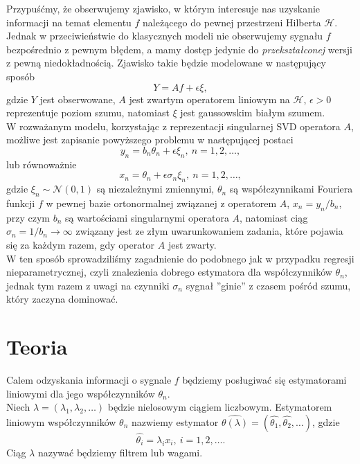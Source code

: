 \documentclass[a0,portrait]{a0poster}
\begin{document}
\begin{multicols}{2}
Przypuśćmy, że obserwujemy zjawisko, w którym interesuje nas uzyskanie informacji na temat elementu $f$ należącego do pewnej przestrzeni Hilberta $\mathcal{H}$. Jednak w przeciwieństwie do klasycznych modeli nie obserwujemy sygnału $f$ bezpośrednio z pewnym błędem, a mamy dostęp jedynie do \textit{przekształconej} wersji z pewną niedokładnością. Zjawisko takie będzie modelowane w następujący sposób
\begin{displaymath}
Y=Af+\epsilon \xi,
\end{displaymath}
gdzie $Y$ jest obserwowane, $A$ jest zwartym operatorem liniowym  na $\mathcal{H}$, $\epsilon>0$ reprezentuje poziom szumu, natomiast $\xi$ jest gaussowskim białym szumem.\\
W rozważanym modelu, korzystając z reprezentacji singularnej SVD operatora $A$, możliwe jest zapisanie powyższego problemu w następującej postaci
\begin{displaymath}
y_n=b_n\theta_n+\epsilon\xi_n,\ n=1,2,\dots ,
\end{displaymath}
lub równoważnie
\begin{displaymath}
x_n=\theta_n+\epsilon\sigma_n\xi_n,\ n=1,2,\dots,
\end{displaymath}
gdzie $\xi_n\sim \mathcal{N}(0,1)$ są niezależnymi zmiennymi, $\theta_n$ są współczynnikami Fouriera funkcji $f$ w pewnej bazie ortonormalnej związanej z operatorem $A$, $x_n=y_n/b_n$, przy czym $b_n$ są wartościami singularnymi operatora $A$, natomiast ciąg $\sigma_n=1/b_n \to \infty$ związany jest ze złym uwarunkowaniem zadania, które pojawia się za każdym razem, gdy operator $A$ jest zwarty.\\
W ten sposób sprowadziliśmy zagadnienie do podobnego jak w przypadku regresji nieparametrycznej, czyli znalezienia dobrego estymatora dla współczynników $\theta_n$, jednak tym razem z uwagi na czynniki $\sigma_n$ sygnał ''ginie'' z czasem pośród szumu, który zaczyna dominować.


\color{Black} 

\section*{Teoria}
Calem odzyskania informacji o sygnale $f$ będziemy posługiwać się estymatorami liniowymi dla jego współczynników $\theta_n$.\\
Niech $\lambda=(\lambda_1,\lambda_2,\dots)$ będzie nielosowym ciągiem liczbowym. Estymatorem liniowym współczynników $\theta_n$ nazwiemy estymator $\hat{\theta(\lambda)}=(\hat{\theta_1},\hat{\theta_2},\dots)$, gdzie
\begin{displaymath}
\hat{\theta_i}=\lambda_ix_i,\ i=1,2,\dots.
\end{displaymath}
Ciąg $\lambda$ nazywać będziemy filtrem lub wagami.


\end{multicols}
\end{document}

